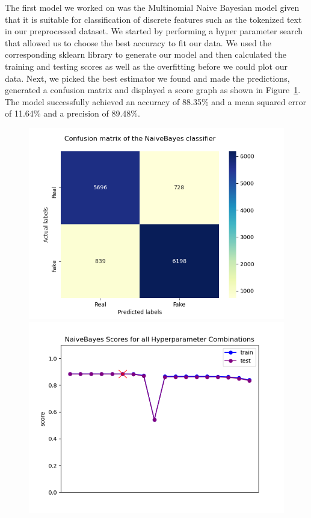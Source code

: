 \documentclass[10pt,twocolumn,letterpaper]{article}
\begin{document}
The first model we worked on was the Multinomial Naive Bayesian model given that it is suitable for classification of discrete features such as the tokenized text in our preprocessed dataset. We started by performing a hyper parameter search that allowed us to choose the best accuracy to fit our data. We used the corresponding sklearn library to generate our model and then calculated the training and testing scores as well as the overfitting before we could plot our data. Next, we picked the best estimator we found and made the predictions, generated a confusion matrix and displayed a score graph as shown in Figure~\ref{first_figure}. The model successfully achieved an accuracy of 88.35\% and a mean squared error of 11.64\% and a precision of 89.48\%. 

\begin{figure}[h]
   \begin{center}
        \includegraphics[width=\linewidth]{Latex_Report/report/Graphs/NB/confusion_matrix.png}
        \includegraphics[width=\linewidth]{Latex_Report/report/Graphs/NB/scores_plot.png}
   \end{center}
        \vspace*{-8mm}
        \caption{\label{first_figure}}
\end{figure}
\end{document}
